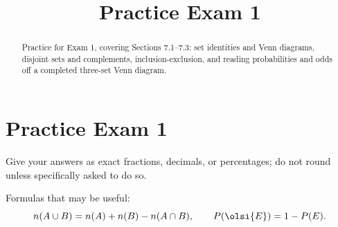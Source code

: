\documentclass[12pt]{ximera}
\title{Practice Exam 1}
\begin{document}
\begin{abstract}
Practice for Exam 1, covering Sections 7.1--7.3: set identities and Venn diagrams,
disjoint sets and complements, inclusion-exclusion, and reading probabilities and
odds off a completed three-set Venn diagram.
\end{abstract}
\maketitle

\section*{Practice Exam 1}

Give your answers as exact fractions, decimals, or percentages; do not round unless
specifically asked to do so.

Formulas that may be useful:
\[
n(A\cup B) = n(A) + n(B) - n(A\cap B), \qquad
P\!\left(\olsi{E}\right)=1-P(E).
\]
\end{document}
